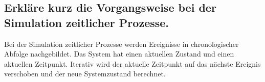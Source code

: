 \documentclass[a4paper,10pt]{article}
\begin{document}
\subsection{Erkläre kurz die Vorgangsweise bei der Simulation zeitlicher Prozesse.}
Bei der Simulation zeitlicher Prozesse werden Ereignisse in chronologischer Abfolge nachgebildet. Das System hat einen aktuellen Zustand und einen aktuellen Zeitpunkt. Iterativ wird der aktuelle Zeitpunkt auf das nächste Ereignis verschoben und der neue Systemzustand berechnet.
\end{document}
